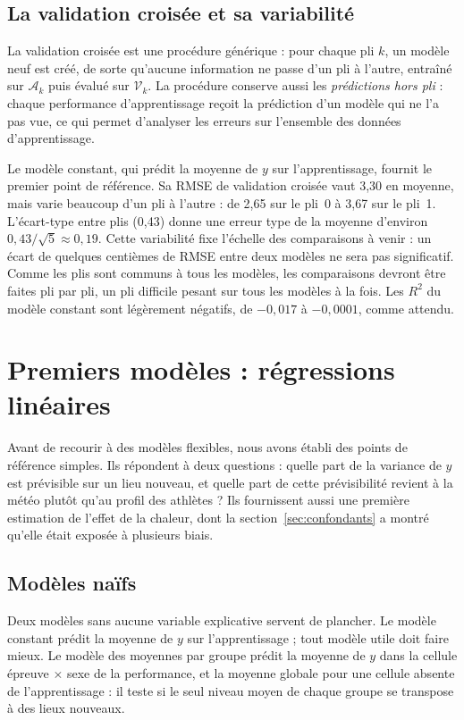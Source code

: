 \documentclass[11pt,a4paper]{article}
\begin{document}
\subsection{La validation croisée et sa variabilité}\label{sec:cv}

La validation croisée est une procédure générique : pour chaque pli $k$, un modèle neuf est créé, de sorte qu'aucune
information ne passe d'un pli à l'autre, entraîné sur $\mathcal{A}_k$ puis évalué sur $\mathcal{V}_k$. La procédure
conserve aussi les \emph{prédictions hors pli} : chaque performance d'apprentissage reçoit la prédiction d'un modèle
qui ne l'a pas vue, ce qui permet d'analyser les erreurs sur l'ensemble des données d'apprentissage.

Le modèle constant, qui prédit la moyenne de $y$ sur l'apprentissage, fournit le premier point de référence. Sa RMSE
de validation croisée vaut 3,30 en moyenne, mais varie beaucoup d'un pli à l'autre : de 2,65 sur le pli~0 à 3,67 sur
le pli~1. L'écart-type entre plis (0,43) donne une erreur type de la moyenne d'environ $0{,}43/\sqrt5 \approx 0{,}19$.
Cette variabilité fixe l'échelle des comparaisons à venir : un écart de quelques centièmes de RMSE entre deux modèles
ne sera pas significatif. Comme les plis sont communs à tous les modèles, les comparaisons devront être faites pli par
pli, un pli difficile pesant sur tous les modèles à la fois. Les $R^2$ du modèle constant sont légèrement négatifs, de
$-0{,}017$ à $-0{,}0001$, comme attendu.

\section{Premiers modèles : régressions linéaires}\label{sec:lineaires}

Avant de recourir à des modèles flexibles, nous avons établi des points de référence simples. Ils répondent à deux
questions : quelle part de la variance de $y$ est prévisible sur un lieu nouveau, et quelle part de cette
prévisibilité revient à la météo plutôt qu'au profil des athlètes ? Ils fournissent aussi une première estimation de
l'effet de la chaleur, dont la section~\ref{sec:confondants} a montré qu'elle était exposée à plusieurs biais.

\subsection{Modèles naïfs}\label{sec:naifs}

Deux modèles sans aucune variable explicative servent de plancher. Le modèle constant prédit la moyenne de $y$ sur
l'apprentissage ; tout modèle utile doit faire mieux. Le modèle des moyennes par groupe prédit la moyenne de $y$ dans
la cellule épreuve $\times$ sexe de la performance, et la moyenne globale pour une cellule absente de l'apprentissage :
il teste si le seul niveau moyen de chaque groupe se transpose à des lieux nouveaux.
\end{document}
